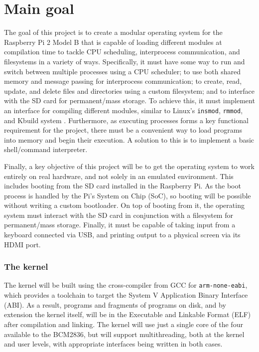 \documentclass[10pt,a4paper]{article}
\newcommand{\code}[1]{\texttt{#1}}
\begin{document}
\section*{Main goal}
The goal of this project is to create a modular operating system for the
Raspberry Pi 2 Model B that is capable of loading different modules at
compilation time to tackle CPU scheduling, interprocess communication, and
filesystems in a variety of ways. Specifically, it must have some way to run and
switch between multiple processes using a CPU scheduler; to use both shared
memory and message passing for interprocess communication; to
create, read, update, and delete files and directories using a custom
filesystem; and to interface with the SD card for permanent/mass storage.  To
achieve this, it must implement an interface for compiling different modules,
similar to Linux's \code{insmod}, \code{rmmod}, and Kbuild system \cite{insmod,
Kbuild}.  Furthermore, as executing processes forms a key functional requirement
for the project, there must be a convenient way to load programs into memory and
begin their execution. A solution to this is to implement a basic shell/command
interpreter.

Finally, a key objective of this project will be to get the operating system to
work entirely on real hardware, and not solely in an emulated environment. This
includes booting from the SD card installed in the Raspberry Pi. As the boot
process is handled by the Pi's System on Chip (SoC), so booting will be possible
without writing a custom bootloader. On top of booting from it, the operating
system must interact with the SD card in conjunction with a filesystem for
permanent/mass storage. Finally, it must be capable of taking input from a
keyboard connected via USB, and printing output to a physical screen via its
HDMI port.

\subsubsection*{The kernel}
The kernel will be built using the cross-compiler from GCC for
\code{arm-none-eabi}, which provides a toolchain to target the System V
Application Binary Interface (ABI). As a result, programs and fragments of
programs on disk, and by extension the kernel itself, will be in the Executable
and Linkable Format (ELF) after compilation and linking. The kernel will use
just a single core of the four available to the BCM2836, but will support
multithreading, both at the kernel and user levels, with appropriate interfaces
being written in both cases. 
\end{document}
